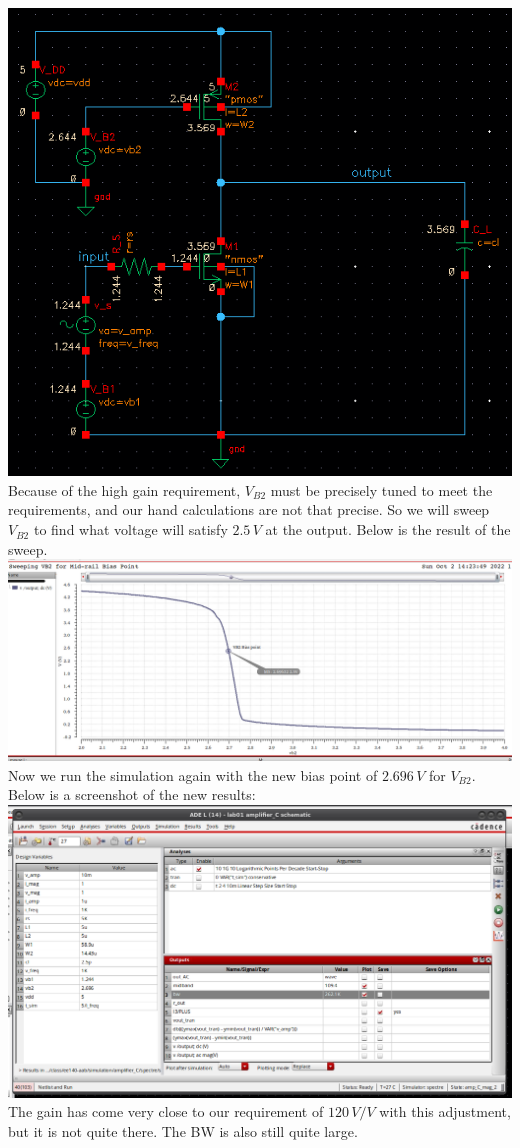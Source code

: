 \documentclass[12pt, fleqn]{article}
\begin{document}
\includegraphics[scale=0.55, center]{c_dc_voltage.png}\\[0.25cm]
Because of the high gain requirement, $V_{B2}$ must be precisely tuned to meet the requirements, and our hand calculations are not that precise.  So we will sweep $V_{B2}$ to find what voltage will satisfy $2.5\,V$ at the output.  Below is the result of the sweep.\\[0.1cm]
\includegraphics[scale=0.35, center]{c_dc_sweep.png}
\newpage\noindent
Now we run the simulation again with the new bias point of $2.696\,V$ for $V_{B2}$.  Below is a screenshot of the new results:\\[0.1cm]
\includegraphics[scale=0.325, center]{c_gain_bw_new.png}\\[0.25cm]
The gain has come very close to our requirement of $120\,V/V$ with this adjustment, but it is not quite there.  The BW is also still quite large.
\end{document}
